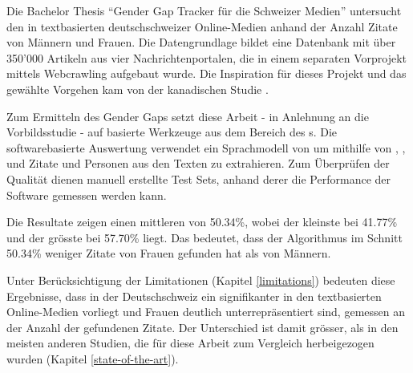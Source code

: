 

Die Bachelor Thesis \enquote{Gender Gap Tracker für die Schweizer Medien} untersucht den 
in textbasierten deutschschweizer Online-Medien anhand der Anzahl Zitate von Männern und Frauen.
Die Datengrundlage bildet eine Datenbank mit über 350'000 Artikeln aus vier Nachrichtenportalen, die in einem separaten
Vorprojekt \cite{project2} mittels Webcrawling aufgebaut wurde.
Die Inspiration für dieses Projekt und das gewählte Vorgehen kam von der kanadischen Studie 
\cite{gender_gap_tracker}.

Zum Ermitteln des Gender Gaps setzt diese Arbeit - in Anlehnung an die Vorbildsstudie - auf  basierte Werkzeuge aus dem Bereich
des s. Die softwarebasierte Auswertung verwendet ein Sprachmodell von 
um mithilfe von , ,  und  Zitate und Personen aus den
Texten zu extrahieren. Zum Überprüfen der Qualität dienen manuell erstellte Test Sets, anhand derer die
Performance der Software gemessen werden kann.

Die Resultate zeigen einen mittleren  von 50.34\%, wobei der kleinste bei 41.77\% und der grösste
bei 57.70\% liegt. Das bedeutet, dass der Algorithmus im Schnitt 50.34\% weniger Zitate von Frauen gefunden hat als von Männern.


Unter Berücksichtigung der Limitationen (Kapitel \ref{limitations}) bedeuten diese Ergebnisse, dass in der Deutschschweiz ein
signifikanter  in den textbasierten Online-Medien vorliegt und Frauen deutlich unterrepräsentiert sind, 
gemessen an der Anzahl der gefundenen Zitate. Der Unterschied ist damit grösser, als in den meisten anderen Studien, 
die für diese Arbeit zum Vergleich herbeigezogen wurden (Kapitel \ref{state-of-the-art}).